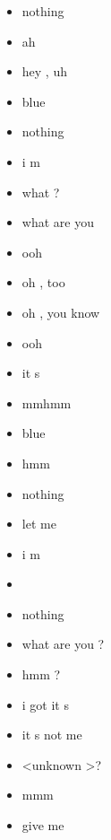 \begin{multicols}{4}
\begin{itemize}[noitemsep]
		\item nothing
		\item ah
		\item hey , uh
		\item blue
		\item nothing
		\item i m
		\item what ?
		\item what are you
		\item ooh
		\item oh , too
		\item oh , you know
		\item ooh
		\item it s
		\item mmhmm
		\item blue
		\item hmm
		\item nothing
		\item let me
		\item i m
		\item
		\item nothing
		\item what are you ?
		\item hmm ?
		\item i got it s
		\item it s not me
		\item \textless unknown \textgreater ?
		\item mmm
		\item give me
	\end{itemize}
\end{multicols}

